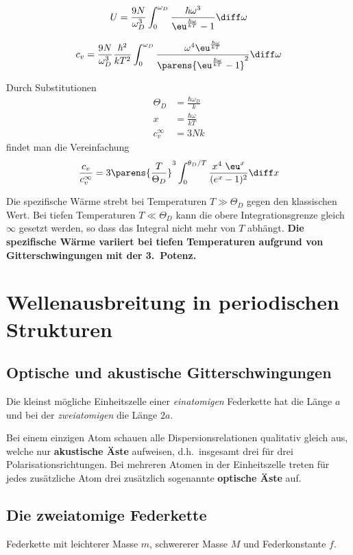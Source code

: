 			\[
				U = \frac{9N}{\omega_D^3} \int_0^{\omega_D} \frac{\hbar\omega^3}{\eu^{\frac{\hbar\omega}{kT}} - 1} \diff \omega
			\]
			
			\[
				c_v = \frac{9N}{\omega_D^3} \frac{\hbar^2}{kT^2} \int_0^{\omega_D} \frac{\omega^4 \eu^{\frac{\hbar\omega}{kT}}}{\parens{\eu^{\frac{\hbar\omega}{kT}} - 1}^2} \diff \omega
			\]
			
			Durch Substitutionen
			\begin{align*}
				\Theta_D &= \frac{\hbar \omega_D}{k} \\
				x &= \frac{\hbar\omega}{kT} \\
				c_v^\infty &= 3Nk
			\end{align*}
			findet man die Vereinfachung
			\[
				\frac{c_v}{c_v^\infty} = 3 \parens{\frac{T}{\Theta_D}}^3 \int_0^{\theta_D/T} \frac{x^4 \ \eu^x}{(e^x - 1)^2} \diff x
			\]
			
			Die spezifische Wärme strebt bei Temperaturen $T \gg \Theta_D$ gegen den klassischen Wert. Bei tiefen Temperaturen $T \ll \Theta_D$ kann die obere Integrationsgrenze gleich $\infty$ gesetzt werden, so dass das Integral nicht mehr von $T$ abhängt. \textbf{Die spezifische Wärme variiert bei tiefen Temperaturen aufgrund von Gitterschwingungen mit der 3.~Potenz.}
\section{Wellenausbreitung in periodischen Strukturen} %
	\subsection{Optische und akustische Gitterschwingungen} %
		Die kleinst mögliche Einheitszelle einer \emph{einatomigen} Federkette hat die Länge $a$ und bei der \emph{zweiatomigen} die Länge $2a$.
		
		Bei einem einzigen Atom schauen alle Dispersionsrelationen qualitativ gleich aus, welche nur \textbf{akustische Äste} aufweisen, d.h.~insgesamt drei für drei Polarisationsrichtungen. Bei mehreren Atomen in der Einheitszelle treten für jedes zusätzliche Atom drei zusätzlich sogenannte \textbf{optische Äste} auf.
	\subsection{Die zweiatomige Federkette} %
		Federkette mit leichterer Masse $m$, schwererer Masse $M$ und Federkonstante $f$.
		
